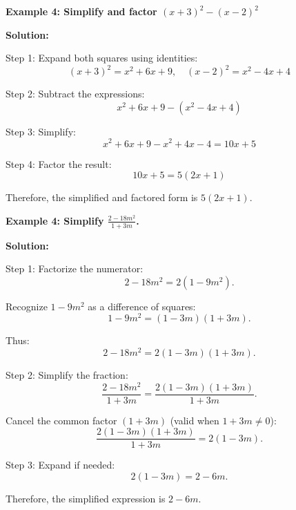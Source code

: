 \begin{flushleft}
\textbf{Example 4: Simplify and factor \((x + 3)^2 - (x - 2)^2\)}

\vspace{0.5cm}
\textbf{Solution:}
\vspace{0.5cm}

Step 1: Expand both squares using identities:
\[
(x + 3)^2 = x^2 + 6x + 9, \quad (x - 2)^2 = x^2 - 4x + 4
\]

Step 2: Subtract the expressions:
\[
x^2 + 6x + 9 - (x^2 - 4x + 4)
\]

Step 3: Simplify:
\[
x^2 + 6x + 9 - x^2 + 4x - 4 = 10x + 5
\]

Step 4: Factor the result:
\[
10x + 5 = 5(2x + 1)
\]

Therefore, the simplified and factored form is \( \boxed{5(2x + 1)} \).

\begin{flushleft}
\textbf{Example 4: Simplify $\frac{2 - 18m^2}{1 + 3m}$.}

\vspace{0.5cm}
\textbf{Solution:}
\vspace{0.5cm}

Step 1: Factorize the numerator:
\[
2 - 18m^2 = 2(1 - 9m^2).
\]

Recognize $1 - 9m^2$ as a difference of squares:
\[
1 - 9m^2 = (1 - 3m)(1 + 3m).
\]

Thus:
\[
2 - 18m^2 = 2(1 - 3m)(1 + 3m).
\]

Step 2: Simplify the fraction:
\[
\frac{2 - 18m^2}{1 + 3m} = \frac{2(1 - 3m)(1 + 3m)}{1 + 3m}.
\]

Cancel the common factor $(1 + 3m)$ (valid when $1 + 3m \neq 0$):
\[
\frac{2(1 - 3m)(1 + 3m)}{1 + 3m} = 2(1 - 3m).
\]

Step 3: Expand if needed:
\[
2(1 - 3m) = 2 - 6m.
\]

Therefore, the simplified expression is $2 - 6m$.
\end{flushleft}
\end{flushleft}
